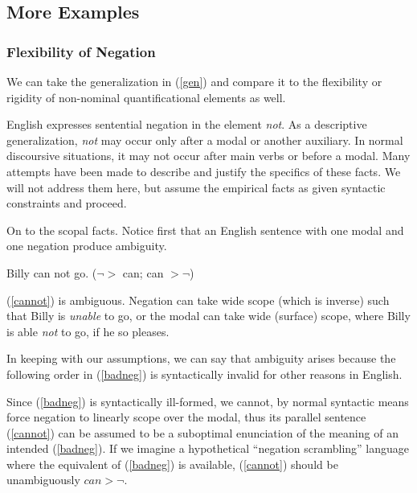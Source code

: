 \documentclass{article}
\begin{document}
\subsection{More Examples}

\subsubsection{Flexibility of Negation}

We can take the generalization in (\ref{gen}) and compare it to the flexibility or rigidity of non-nominal quantificational elements as well.

English expresses sentential negation in the element \emph{not}. As a descriptive generalization, \emph{not} may occur only after a modal or another auxiliary. In normal discoursive situations, it may not occur after main verbs or before a modal. Many attempts have been made to describe and justify the specifics of these facts. We will not address them here, but assume the empirical facts as given syntactic constraints and proceed.

On to the scopal facts. Notice first that an English sentence with one modal and one negation produce ambiguity.

\begin{exe}
\ex Billy can not go. \label{cannot}\hfill ($\neg >$ can; can $> \neg$) 
\end{exe}

(\ref{cannot}) is ambiguous. Negation can take wide scope (which is inverse) such that Billy is \emph{unable} to go, or the modal can take wide (surface) scope, where Billy is able \emph{not} to go, if he so pleases.

In keeping with our assumptions, we can say that ambiguity arises because the following order in (\ref{badneg}) is syntactically invalid for other reasons in English.

\begin{exe}
\end{exe}

Since (\ref{badneg}) is syntactically ill-formed, we cannot, by normal syntactic means force negation to linearly scope over the modal, thus its parallel sentence (\ref{cannot}) can be assumed to be a suboptimal enunciation of the meaning of an intended (\ref{badneg}). If we imagine a hypothetical ``negation scrambling'' language where the equivalent of (\ref{badneg}) is available, (\ref{cannot}) should be unambiguously $can > \neg$.
\end{document}
